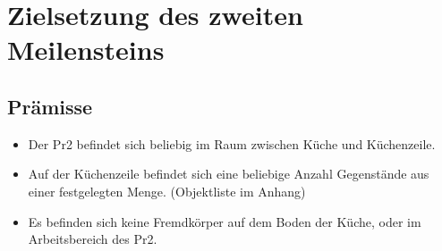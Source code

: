 \documentclass{suturo}
\begin{document}
\newpage

\section{Zielsetzung des zweiten Meilensteins}
\subsection{Prämisse}
\begin{itemize}
\item Der Pr2 befindet sich beliebig im Raum zwischen Küche und Küchenzeile.
\item Auf der Küchenzeile befindet sich eine beliebige Anzahl Gegenstände aus einer festgelegten Menge. (Objektliste im Anhang)
\item Es befinden sich keine Fremdkörper auf dem Boden der Küche, oder im Arbeitsbereich des Pr2.
\end{itemize}
\end{document}
